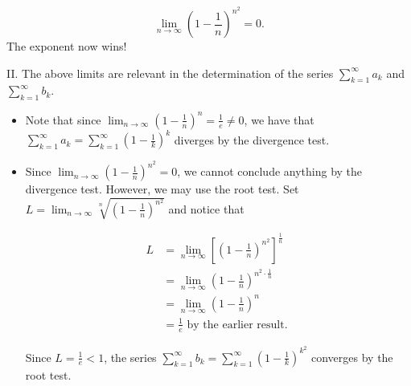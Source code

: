 \documentclass[noauthor,handout]{ximera}
\begin{document}
\begin{problem}
\begin{freeResponse}
\[
 \lim_{n \to \infty} \left(1-\frac{1}{n}\right)^{n^2} = 0.
\] 
The exponent now wins!

II. The above limits are relevant in the determination of the series $\sum_{k=1}^{\infty} a_k$ and $\sum_{k=1}^{\infty} b_k$.  

\begin{itemize} 
\item Note that since $\lim_{n \to \infty} \left(1-\frac{1}{n}\right)^n = \frac{1}{e} \neq 0$, we have that $\sum_{k=1}^{\infty} a_k = \sum_{k=1}^{\infty} \left(1-\frac{1}{k}\right)^k$ diverges by the divergence test.

\item Since $ \lim_{n \to \infty} \left(1-\frac{1}{n}\right)^{n^2} = 0$, we cannot conclude anything by the divergence test.  However, we may use the root test. Set $L = \lim_{n \to \infty} \sqrt[n]{\left(1-\frac{1}{n}\right)^{n^2} } $ and notice that

\begin{align*}
L &= \lim_{n \to \infty} \left[\left(1-\frac{1}{n}\right)^{n^2}\right]^{\frac{1}{n}}\\
&= \lim_{n \to \infty} \left(1-\frac{1}{n}\right)^{n^2\cdot\frac{1}{n}}\\
&= \lim_{n \to \infty} \left(1-\frac{1}{n}\right)^{n}\\
&= \frac{1}{e} \textrm{ by the earlier result. }
\end{align*}

Since $L = \frac{1}{e} < 1$, the series $\sum_{k=1}^{\infty} b_k = \sum_{k=1}^{\infty} \left(1-\frac{1}{k}\right)^{k^2}$ converges by the root test.
\end{itemize}

\end{freeResponse}
\end{problem}
\end{document}
